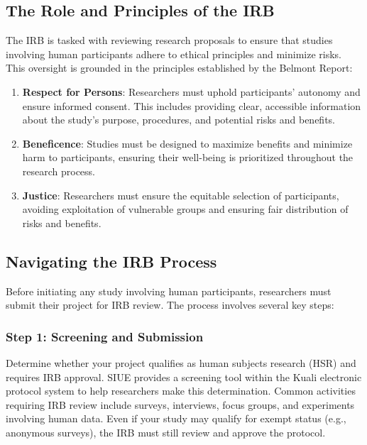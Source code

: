 \documentclass[
]{book}
\providecommand{\tightlist}{%
  \setlength{\itemsep}{0pt}\setlength{\parskip}{0pt}}
\begin{document}
\subsection*{The Role and Principles of the IRB}\label{the-role-and-principles-of-the-irb}

The IRB is tasked with reviewing research proposals to ensure that studies involving human participants adhere to ethical principles and minimize risks. This oversight is grounded in the principles established by the Belmont Report:

\begin{enumerate}
\def\labelenumi{\arabic{enumi}.}
\tightlist
\item
  \textbf{Respect for Persons}: Researchers must uphold participants' autonomy and ensure informed consent. This includes providing clear, accessible information about the study's purpose, procedures, and potential risks and benefits.
\item
  \textbf{Beneficence}: Studies must be designed to maximize benefits and minimize harm to participants, ensuring their well-being is prioritized throughout the research process.
\item
  \textbf{Justice}: Researchers must ensure the equitable selection of participants, avoiding exploitation of vulnerable groups and ensuring fair distribution of risks and benefits.
\end{enumerate}

\subsection*{Navigating the IRB Process}\label{navigating-the-irb-process}

Before initiating any study involving human participants, researchers must submit their project for IRB review. The process involves several key steps:

\subsubsection*{Step 1: Screening and Submission}\label{step-1-screening-and-submission}

Determine whether your project qualifies as human subjects research (HSR) and requires IRB approval. SIUE provides a screening tool within the Kuali electronic protocol system to help researchers make this determination. Common activities requiring IRB review include surveys, interviews, focus groups, and experiments involving human data. Even if your study may qualify for exempt status (e.g., anonymous surveys), the IRB must still review and approve the protocol.
\end{document}
